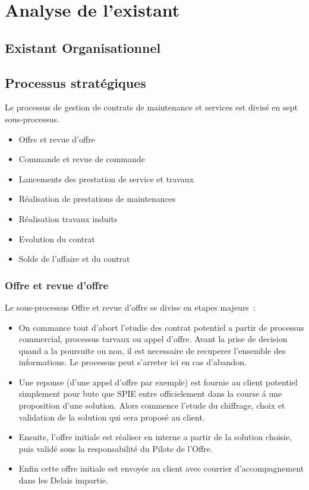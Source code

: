 \chapter{Analyse de l’existant}

\section{Existant Organisationnel}

\section{Processus stratégiques}

Le processus de gestion de contrats de maintenance et services est divis\'e en sept sous-processus.

\begin{itemize}
    \item Offre et revue d'offre
    \item Commande et revue de commande
    \item Lancements des prestation de service et travaux
    \item R\'ealisation de prestations de maintenances
    \item R\'ealisation travaux induits
    \item Evolution du contrat
    \item Solde de l'affaire et du contrat
\end{itemize}

\subsection{Offre et revue d'offre}

Le sous-processus Offre et revue d'offre se divise en etapes majeurs~:

\begin{itemize}
    \item On commance tout d'abort l'etudie des contrat potentiel a partir de processus commercial,
    processus tarvaux ou appel d'offre. Avant la prise de decision quand a la poursuite ou non,
    il est necessaire de recuperer l'ensemble des informations. Le processus peut s'arreter ici
    en cas d'abandon.
    \item Une reponse (d'une appel d'offre par exemple) est fournie au client potentiel simplement
    pour bute que SPIE entre officielement dans la course \'a une proposition d'une solution. Alors
    commence l'etude du chiffrage, choix et validation de la solution qui sera propos\'e au client.
    \item Ensuite, l'offre initiale est r\'ealiser en interne a partir de la solution choisie, puis
    valid\'e sous la responsabilit\'e du Pilote de l'Offre.
    \item Enfin cette offre initiale est envoy\'ee au client avec courrier d'accompagnement dans les
    Delais impartie.
\end{itemize}

